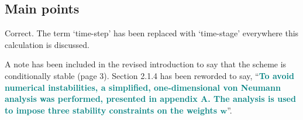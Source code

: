 \documentclass[times]{elsarticle}
\newcommand{\revtwo}[1]{\textcolor{teal}{\textbf{#1}}}
\begin{document}
\subsection*{Main points}

\begin{quotation}
\begin{comment}
\setcounter{commenti}{0}
\item It is claimed (in several places) that the scheme requires `just one
vector multiply per face per time step'. Since the two-stage Heun scheme
(2) is used, surely the cost must be two vector multiplies per face per time
step (or, more generally, one vector multiply per face per {\it stage})?
\end{comment}
\end{quotation}
Correct.  The term `time-step' has been replaced with `time-stage' everywhere this calculation is discussed.

\begin{quotation}
\begin{comment}
\item It is claimed in several places that the scheme is stable, but some qualification
is appropriate. First, the scheme is {\it conditionally} stable; the Courant number
should not be too large. Then Appendix~A gives an analysis deriving constraints
on the polynomial reconstruction that should be satisfied for stability. However,
the analysis is idealized in various ways: one-dimensional, regular grid, constant $v$,
two- and three-cell stencils, and ignoring the time discretization (also see below).
That is fair enough---it might not be possible to generalize the analysis to the full
scheme---and it is clearly stated at the end of the Appendix that the constraints are
{\it hypothesized} to apply more generally. However, in section 2.1.4 the language is
stronger and suggests that these constraints are definitive: ``...stability constraints...'',
``...must satisfy...'', etc.
\end{comment}
\end{quotation}
A note has been included in the revised introduction to say that the scheme is conditionally stable (page 3).
Section 2.1.4 has been reworded to say, ``\revtwo{To avoid numerical instabilities, a simplified, one-dimensional von Neumann analysis was performed, presented in appendix A.  The analysis is used to impose three stability constraints on the weights $\mathbf{w}$}''.
\end{document}
